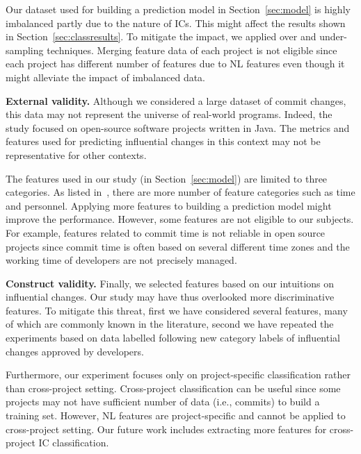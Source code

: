 Our dataset used for building a prediction model in Section~\ref{sec:model} is highly imbalanced partly due to 
the nature of ICs. This might affect the results shown in Section~\ref{sec:classresults}. 
To mitigate the impact, we applied over and under-sampling techniques.%
Merging feature data of each project is not eligible since each project has different number of features 
due to NL features even though it might alleviate the impact of imbalanced data.



\textbf{External validity.} Although we considered a large dataset of commit
changes, this data may not represent the universe of real-world programs.
Indeed, the study focused on open-source software projects written in Java.
The metrics and features used for predicting influential changes in this context
may not be representative for other contexts.

The features used in our study (in Section~\ref{sec:model})
are limited to three categories. As listed in~\cite{shihab_industrial_2012}, there are more number of feature categories such as time and personnel. Applying more features to building a prediction model might improve the performance. However, some features are not eligible to our subjects. 
For example, features related to commit time is not reliable in open source projects since commit time is often based on several different time zones and the working time of developers are not precisely managed.


\textbf{Construct validity.} Finally, we selected features based on
our intuitions on influential changes. Our study may have thus overlooked more
discriminative features. To mitigate this threat, first we have considered several
features, many of which are commonly known in the literature, second we have repeated
the experiments based on data labelled following  new category labels of influential changes
approved by developers. 

Furthermore, our experiment focuses only on project-specific classification rather than cross-project setting. Cross-project classification can be useful since some projects may not have sufficient number of data (i.e., commits) to build a training set. However, NL features are project-specific and cannot be
applied to cross-project setting. 
Our future work includes extracting more features for cross-project IC classification.
